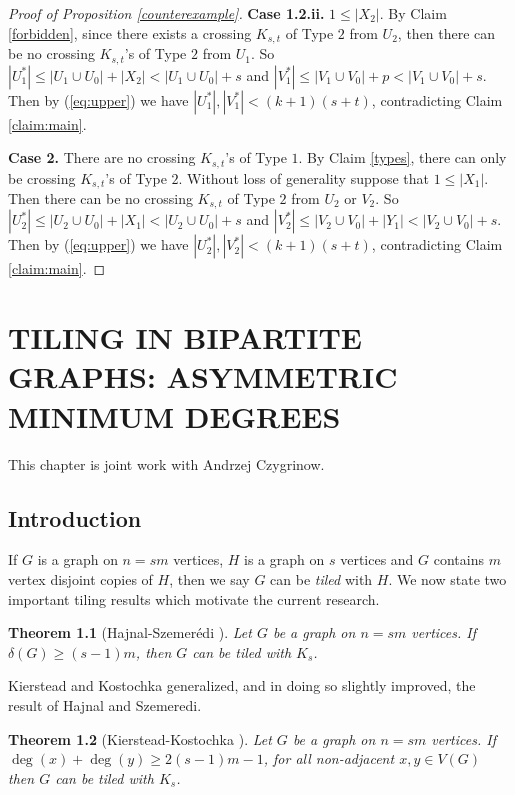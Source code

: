 \documentclass[oneside,12pt]{memoir}
\newtheorem{theorem}{Theorem}[section]
\begin{document}
\begin{proof}[Proof of Proposition \ref{counterexample}]
\textbf{Case 1.2.ii.} $1\leq |X_2|$. By Claim \ref{forbidden}, since there exists a crossing $K_{s,t}$ of Type $2$ from $U_2$, then there can be no crossing $K_{s,t}$'s of Type $2$ from $U_1$.  So $|U_1^*|\leq |U_1\cup U_0|+|X_2|<|U_1\cup U_0|+s$ and $|V_1^*|\leq |V_1\cup V_0|+p<|V_1\cup V_0|+s$.  Then by (\ref{eq:upper}) we have $|U_1^*|, |V_1^*|<(k+1)(s+t)$, contradicting Claim \ref{claim:main}.

\noindent
\textbf{Case 2.} There are no crossing $K_{s,t}$'s of Type $1$.  By Claim  \ref{types}, there can only be crossing $K_{s,t}$'s of Type $2$.  Without loss of generality suppose that $1\leq |X_1|$.  Then there can be no crossing $K_{s,t}$ of Type $2$ from $U_2$ or $V_2$. So $|U_2^*|\leq |U_2\cup U_0|+|X_1|<|U_2\cup U_0|+s$ and $|V_2^*|\leq |V_2\cup V_0|+|Y_1|<|V_2\cup V_0|+s$.  Then by (\ref{eq:upper}) we have $|U_2^*|, |V_2^*|<(k+1)(s+t)$, contradicting Claim \ref{claim:main}.

\end{proof}


\chapter{TILING IN BIPARTITE GRAPHS: ASYMMETRIC MINIMUM DEGREES}\label{sumdegtilingchapter}

\DoubleSpacing
\setlength{\parindent}{.5in}

This chapter is joint work with Andrzej Czygrinow.


\section{Introduction}

If $G$ is a graph on $n=sm$ vertices, $H$ is a graph on $s$ vertices and $G$ contains $m$ vertex disjoint copies of $H$, then we say $G$ can be \emph{tiled} with $H$.  We now state two important tiling results which motivate the current research.

\begin{theorem}[Hajnal-Szemer\'edi \cite{HSz}]
Let $G$ be a graph on $n=sm$ vertices.  If $\delta(G)\geq (s-1)m$, then $G$ can be tiled with $K_s$.
\end{theorem}

Kierstead and Kostochka generalized, and in doing so slightly improved, the result of Hajnal and Szemeredi.

\begin{theorem}[Kierstead-Kostochka \cite{KK}]
Let $G$ be a graph on $n=sm$ vertices.  If $\deg(x)+\deg(y)\geq 2(s-1)m-1$, for all non-adjacent $x,y\in V(G)$ then $G$ can be tiled with $K_s$.
\end{theorem}
\end{document}
